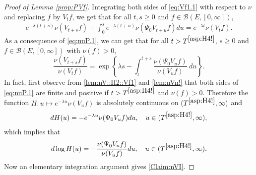 \documentclass[12pt,a4paper]{amsart}
\numberwithin{equation}{section}
\theoremstyle{plain}
\theoremstyle{definition}
\theoremstyle{remark}
\begin{document}
\begin{proof}[Proof of Lemma \ref{prop:PVf}]
	
	Integrating  both sides of \eqref{eq:Vf1.1} with respect to $\nu$ and replacing $f$ by $V_t f$, we get that for all $t, s\geq 0$ and $f\in \mathcal B(E,[0,\infty])$,
\begin{align}\label{eq:nuP.1}
	e^{- \lambda (t+s)} \nu(V_{t+s}f) + \int_0^s e^{- \lambda (t+u)} \nu(\Psi_0 V_{t+u}f) du
	= e^{- \lambda t} \nu(V_t f).
\end{align}
	As a consequence of \eqref{eq:nuP.1}, we can get that for all $t>T^{\eqref{asp:H4!}}$, $s\geq 0$ and $f \in \mathcal B(E,[0,\infty])$ with $\nu(f)>0$,
\begin{equation}\label{Claim:nVI}
	\frac{\nu(V_{t+s} f)} {\nu(V_t f)}
	= \exp\left\{ \lambda s - \int_t^{t+s} \frac{\nu(\Psi_0 V_u f) }{\nu(V_u f)} ~du\right\}.
\end{equation}
	In fact, first observe from \eqref{lem:nV::H2::Vf1} and \eqref{lem:nVn!} that both sides of \eqref{eq:nuP.1} are finite and positive if $t> T^{\eqref{asp:H4!}}$ and $\nu(f)>0$.
	Therefore the function $H: u\mapsto e^{-\lambda u}\nu(V_u f)$ is absolutely continuous on $(T^{\eqref{asp:H4!}},\infty)$ and
\begin{align}
	d H(u)
	= - e^{- \lambda u} \nu(\Psi_0 V_u f) du,
	\quad u\in (T^{\eqref{asp:H4!}},\infty),
\end{align}
	which implies that
\begin{align}
	d \log H(u)
	= - \frac{\nu(\Psi_0 V_u f )}{ \nu(V_u f)} du,
	\quad u \in (T^{\eqref{asp:H4!}},\infty).
\end{align}
	Now an elementary integration argument gives \eqref{Claim:nVI}.
	

\end{proof}
\end{document}
